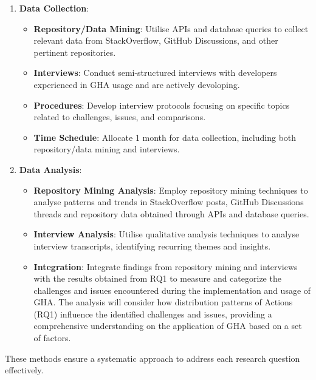 \documentclass[conference]{IEEEtran}
\begin{document}
        \begin{enumerate}
            \item \textbf{Data Collection}:\\
            \begin{itemize}
                \item \textbf{Repository/Data Mining}: Utilise APIs and database queries to collect relevant data from StackOverflow, GitHub Discussions, and other pertinent repositories.
                \item \textbf{Interviews}: Conduct semi-structured interviews with developers experienced in GHA usage and are actively devoloping.
                \item \textbf{Procedures}: Develop interview protocols focusing on specific topics related to challenges, issues, and comparisons.
                \item \textbf{Time Schedule}: Allocate 1 month for data collection, including both repository/data mining and interviews.\\
            \end{itemize}
            
            \item \textbf{Data Analysis}:\\
            \begin{itemize}
                \item \textbf{Repository Mining Analysis}: Employ repository mining techniques to analyse patterns and trends in StackOverflow posts, GitHub Discussions threads and repository data obtained through APIs and database queries.
                \item \textbf{Interview Analysis}: Utilise qualitative analysis techniques to analyse interview transcripts, identifying recurring themes and insights.
                \item \textbf{Integration}: Integrate findings from repository mining and interviews with the results obtained from RQ1 to measure and categorize the challenges and issues encountered during the implementation and usage of GHA. The analysis will consider how distribution patterns of Actions (RQ1) influence the identified challenges and issues, providing a comprehensive understanding on the application of GHA based on a set of factors.\\
            \end{itemize}
        \end{enumerate}

        These methods ensure a systematic approach to address each research question effectively.\\
\end{document}
